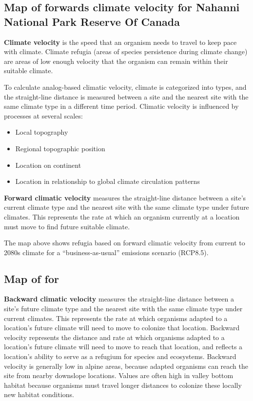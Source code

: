 \documentclass[
]{article}
\providecommand{\tightlist}{%
  \setlength{\itemsep}{0pt}\setlength{\parskip}{0pt}}
\begin{document}
\pagebreak

\hypertarget{map-of-forwards-climate-velocity-for-nahanni-national-park-reserve-of-canada}{%
\subsection{Map of forwards climate velocity for Nahanni National Park
Reserve Of
Canada}\label{map-of-forwards-climate-velocity-for-nahanni-national-park-reserve-of-canada}}

\textbf{Climate velocity} is the speed that an organism needs to travel
to keep pace with climate. Climate refugia (areas of species persistence
during climate change) are areas of low enough velocity that the
organism can remain within their suitable climate.

To calculate analog-based climatic velocity, climate is categorized into
types, and the straight-line distance is measured between a site and the
nearest site with the same climate type in a different time period.
Climatic velocity is influenced by processes at several scales:

\begin{itemize}
\tightlist
\item
  Local topography
\item
  Regional topographic position
\item
  Location on continent
\item
  Location in relationship to global climate circulation patterns
\end{itemize}

\textbf{Forward climatic velocity} measures the straight-line distance
between a site's current climate type and the nearest site with the same
climate type under future climates. This represents the rate at which an
organism currently at a location must move to find future suitable
climate.

The map above shows refugia based on forward climatic velocity from
current to 2080s climate for a ``business-as-usual'' emissions scenario
(RCP8.5).

\pagebreak

\hypertarget{map-of-for}{%
\subsection{Map of for}\label{map-of-for}}

\textbf{Backward climatic velocity} measures the straight-line distance
between a site's future climate type and the nearest site with the same
climate type under current climates. This represents the rate at which
organisms adapted to a location's future climate will need to move to
colonize that location. Backward velocity represents the distance and
rate at which organisms adapted to a location's future climate will need
to move to reach that location, and reflects a location's ability to
serve as a refugium for species and ecosystems. Backward velocity is
generally low in alpine areas, because adapted organisms can reach the
site from nearby downslope locations. Values are often high in valley
bottom habitat because organisms must travel longer distances to
colonize these locally new habitat conditions.
\end{document}
